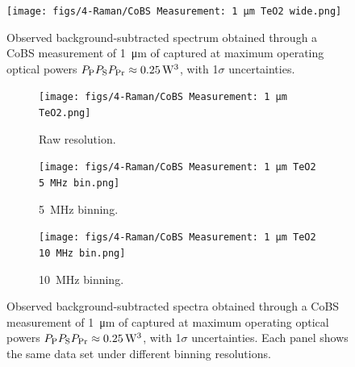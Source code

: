 \begin{figure}[t]
  \centering
  \hspace{-2em}\texttt{[image: figs/4-Raman/CoBS Measurement: 1 μm TeO2 wide.png]}
  \caption[Observed spectrum obtained through a \ac{CoBS} measurement of \SI{1}{\micro\meter} of .]{Observed background-subtracted spectrum obtained through a \ac{CoBS} measurement of \SI{1}{\micro\meter} of  captured at maximum operating optical powers \(P_{\rm P}P_{\rm S}P_{\rm Pr} \approx \SI{0.25}{\cubic\watt}\), with 1\(\sigma\) uncertainties.}
  \label{fig:Raman:1umTeO2}
\end{figure}

\begin{figure}[th!]
  \centering
  \begin{subfigure}[b]{0.85\textwidth}
    \centering
    \hspace{-2em}\texttt{[image: figs/4-Raman/CoBS Measurement: 1 μm TeO2.png]}
    \caption{Raw resolution.}
    \label{fig:Raman:1umTeO2Raw}
  \end{subfigure}

  \vspace{1em}

  \begin{subfigure}[b]{0.49\textwidth}
    \centering
    \texttt{[image: figs/4-Raman/CoBS Measurement: 1 μm TeO2 5 MHz bin.png]}
    \caption{\SI{5}{\mega\hertz} binning.}
    \label{fig:Raman:1umTeO25MHzBin}
  \end{subfigure}
  \hfill
  \begin{subfigure}[b]{0.49\textwidth}
    \centering
    \texttt{[image: figs/4-Raman/CoBS Measurement: 1 μm TeO2 10 MHz bin.png]}
    \caption{\SI{10}{\mega\hertz} binning.}
    \label{fig:Raman:1umTeO10MHzBin}
  \end{subfigure}

  \caption[Observed spectra obtained through a \ac{CoBS} measurement of \SI{1}{\micro\meter} of .]{Observed background-subtracted spectra obtained through a \ac{CoBS} measurement of \SI{1}{\micro\meter} of  captured at maximum operating optical powers \(P_{\rm P}P_{\rm S}P_{\rm Pr} \approx \SI{0.25}{\cubic\watt}\), with 1\(\sigma\) uncertainties. Each panel shows the same data set under different binning resolutions.}
  \label{fig:Raman:1umTeO2_combined}
\end{figure}

